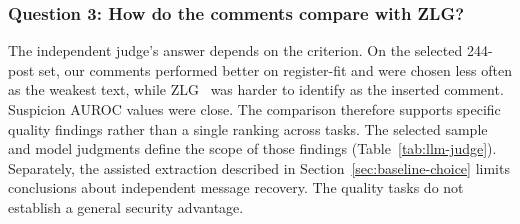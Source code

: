 \subsubsection{Question 3: How do the comments compare with ZLG?}
The independent judge's answer depends on the criterion. On the selected 244-post set, our comments performed better on register-fit and were chosen less often as the weakest text, while ZLG~\cite{lin2024zero} was harder to identify as the inserted comment. Suspicion AUROC values were close. The comparison therefore supports specific quality findings rather than a single ranking across tasks. The selected sample and model judgments define the scope of those findings (Table~\ref{tab:llm-judge}). Separately, the assisted extraction described in Section~\ref{sec:baseline-choice} limits conclusions about independent message recovery. The quality tasks do not establish a general security advantage.
